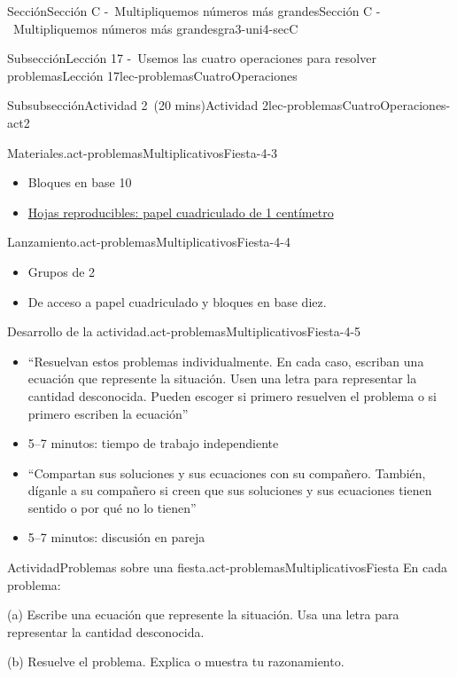 \documentclass[oneside,10pt,]{article}
\begin{document}
\begin{sectionptx}{Sección}{Sección C -~Multipliquemos números más grandes}{}{Sección C -~Multipliquemos números más grandes}{}{}{gra3-uni4-secC}
\begin{subsectionptx}{Subsección}{Lección 17 -~Usemos las cuatro operaciones para resolver problemas}{}{Lección 17}{}{}{lec-problemasCuatroOperaciones}
\begin{subsubsectionptx}{Subsubsección}{Actividad 2~(20 mins)}{}{Actividad 2}{}{}{lec-problemasCuatroOperaciones-act2}
\begin{paragraphs}{Materiales.}{act-problemasMultiplicativosFiesta-4-3}
%
\begin{itemize}[label=\textbullet]
\item{}Bloques en base 10%
\item{}\hyperref[blm-papelCuadriculadoCentimetro]{Hojas reproducibles: papel cuadriculado de 1 centímetro}%
\end{itemize}
\end{paragraphs}%
\begin{paragraphs}{Lanzamiento.}{act-problemasMultiplicativosFiesta-4-4}%
%
\begin{itemize}[label=\textbullet]
\item{}Grupos de 2%
\item{}De acceso a papel cuadriculado y bloques en base diez.%
\end{itemize}
\end{paragraphs}%
\begin{paragraphs}{Desarrollo de la actividad.}{act-problemasMultiplicativosFiesta-4-5}%
%
\begin{itemize}[label=\textbullet]
\item{}``Resuelvan estos problemas individualmente. En cada caso, escriban una ecuación que represente la situación. Usen una letra para representar la cantidad desconocida. Pueden escoger si primero resuelven el problema o si primero escriben la ecuación''%
\item{}5–7 minutos: tiempo de trabajo independiente%
\item{}``Compartan sus soluciones y sus ecuaciones con su compañero. También, díganle a su compañero si creen que sus soluciones y sus ecuaciones tienen sentido o por qué no lo tienen''%
\item{}5–7 minutos: discusión en pareja%
\end{itemize}
\end{paragraphs}%
\begin{activity}{Actividad}{Problemas sobre una fiesta.}{act-problemasMultiplicativosFiesta}%
En cada problema:%
\begin{sidebyside}{2}{0.02}{0}{0.08}%
\begin{sbspanel}{0.6}%
(a) Escribe una ecuación que represente la situación. Usa una letra para representar la cantidad desconocida.%
\par
(b) Resuelve el problema. Explica o muestra tu razonamiento.%
\end{sbspanel}%
\begin{sbspanel}{0.3}%

\end{sbspanel}
\end{sidebyside}
\end{activity}
\end{subsubsectionptx}
\end{subsectionptx}
\end{sectionptx}
\end{document}
